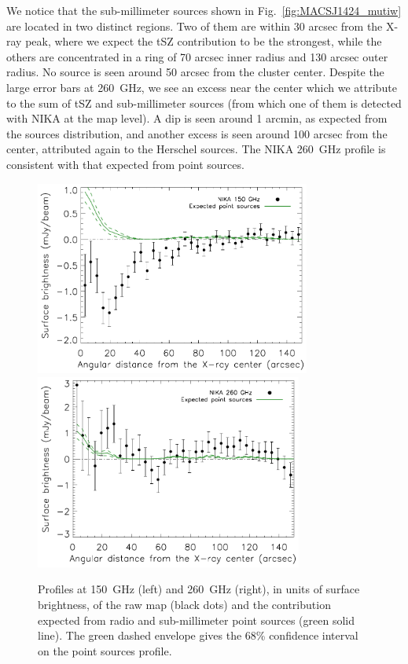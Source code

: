 \documentclass[twocolumn,traditabstract]{aa}
\begin{document}
We notice that the sub-millimeter sources shown in Fig.~\ref{fig:MACSJ1424_mutiw} are located in two distinct regions. Two of them are within 30 arcsec from the X-ray peak, where we expect the tSZ contribution to be the strongest, while the others are concentrated in a ring of 70 arcsec inner radius and 130 arcsec outer radius. No source is seen around 50 arcsec from the cluster center. Despite the large error bars at 260~GHz, we see an excess near the center which we attribute to the sum of tSZ and sub-millimeter sources (from which one of them is detected with NIKA at the map level). A dip is seen around 1 arcmin, as expected from the sources distribution, and another excess is seen around 100 arcsec from the center, attributed again to the Herschel sources. The NIKA 260~GHz profile is consistent with that expected from point sources.
\begin{figure}[h]
\centering
\includegraphics[height=6.4cm]{Figure/MACSJ1424_profile2mm_plus_ps.pdf}
\includegraphics[height=6.4cm]{Figure/MACSJ1424_profile1mm_plus_ps.pdf}
\caption{Profiles at 150~GHz (left) and 260~GHz (right), in units of surface brightness, of the raw map (black dots) and the contribution expected from radio and sub-millimeter point sources (green solid line). The green dashed envelope gives the 68\% confidence interval on the point sources profile.}
\label{fig:flux_profiles}
\end{figure}
\end{document}
